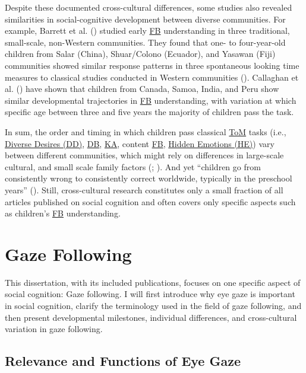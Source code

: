 \documentclass[
]{scrbook}
\begin{document}
Despite these documented cross-cultural differences, some studies also revealed similarities in social-cognitive development between diverse communities. For example, Barrett et al. () studied early \hyperref[acronyms_FB]{FB} understanding in three traditional, small-scale, non-Western communities. They found that one- to four-year-old children from Salar (China), Shuar/Colono (Ecuador), and Yasawan (Fiji) communities showed similar response patterns in three spontaneous looking time measures to classical studies conducted in Western communities (). Callaghan et al. () have shown that children from Canada, Samoa, India, and Peru show similar developmental trajectories in \hyperref[acronyms_FB]{FB} understanding, with variation at which specific age between three and five years the majority of children pass the task.

In sum, the order and timing in which children pass classical \hyperref[acronyms_ToM]{ToM} tasks (i.e., \hyperref[acronyms_DD]{Diverse Desires (DD)}, \hyperref[acronyms_DB]{DB}, \hyperref[acronyms_KA]{KA}, content \hyperref[acronyms_FB]{FB}, \hyperref[acronyms_HE]{Hidden Emotions (HE)}) vary between different communities, which might rely on differences in large-scale cultural, and small scale family factors (; ). And yet ``children go from consistently wrong to consistently correct worldwide, typically in the preschool years'' (). Still, cross-cultural research constitutes only a small fraction of all articles published on social cognition and often covers only specific aspects such as children's \hyperref[acronyms_FB]{FB} understanding.

\section{Gaze Following}\label{intro-gaze}

This dissertation, with its included publications, focuses on one specific aspect of social cognition: Gaze following. I will first introduce why eye gaze is important in social cognition, clarify the terminology used in the field of gaze following, and then present developmental milestones, individual differences, and cross-cultural variation in gaze following.

\subsection{Relevance and Functions of Eye Gaze}\label{relevance-and-functions-of-eye-gaze}
\end{document}
